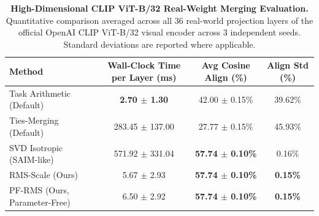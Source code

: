 \begin{table}[t]
\caption{\textbf{High-Dimensional CLIP ViT-B/32 Real-Weight Merging Evaluation.} Quantitative comparison averaged across all 36 real-world projection layers of the official OpenAI CLIP ViT-B/32 visual encoder across 3 independent seeds. Standard deviations are reported where applicable.}
\label{tab:high_dim_sim}
\vskip 0.15in
\begin{center}
\begin{small}
\begin{sc}
\begin{tabular}{lccc}
\toprule
Method & Wall-Clock Time per Layer (ms) & Avg Cosine Align (\%) & Align Std (\%) \\
\midrule
Task Arithmetic (Default) & \textbf{2.70 $\pm$ 1.30} & 42.00 $\pm$ 0.15\% & 39.62\% \\
Ties-Merging (Default) & 283.45 $\pm$ 137.00 & 27.77 $\pm$ 0.15\% & 45.93\% \\
SVD Isotropic (SAIM-like) & 571.92 $\pm$ 331.04 & \textbf{57.74 $\pm$ 0.10\%} & 0.16\% \\
\midrule
RMS-Scale (Ours) & 5.67 $\pm$ 2.93 & \textbf{57.74 $\pm$ 0.10\%} & \textbf{0.15\%} \\
PF-RMS (Ours, Parameter-Free) & 6.50 $\pm$ 2.92 & \textbf{57.74 $\pm$ 0.10\%} & \textbf{0.15\%} \\
\bottomrule
\end{tabular}
\end{sc}
\end{small}
\end{center}
\vskip -0.1in
\end{table}

